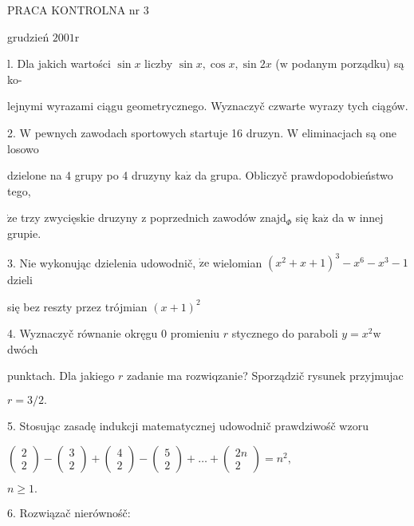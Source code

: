 \documentclass[a4paper,12pt]{article}
\begin{document}
PRACA KONTROLNA nr 3

grudzień $2001\mathrm{r}$

l. Dla jakich wartości $\sin x$ liczby $\sin x, \cos x, \sin 2x$ ($\mathrm{w}$ podanym porządku) są ko-

lejnymi wyrazami ciągu geometrycznego. Wyznaczyč czwarte wyrazy tych ciągów.

2. $\mathrm{W}$ pewnych zawodach sportowych startuje 16 druzyn. $\mathrm{W}$ eliminacjach są one losowo

dzielone na 4 grupy po 4 druzyny $\mathrm{k}\mathrm{a}\dot{\mathrm{z}}$ da grupa. Obliczyč prawdopodobieństwo tego,

$\dot{\mathrm{z}}\mathrm{e}$ trzy zwycięskie druzyny $\mathrm{z}$ poprzednich zawodów $\mathrm{z}\mathrm{n}\mathrm{a}\mathrm{j}\mathrm{d}_{\Phi}$ się $\mathrm{k}\mathrm{a}\dot{\mathrm{z}}$ da $\mathrm{w}$ innej grupie.

3. Nie wykonując dzielenia udowodnič, $\dot{\mathrm{z}}\mathrm{e}$ wielomian $(x^{2}+x+1)^{3}-x^{6}-x^{3}-1$ dzieli

się bez reszty przez trójmian $(x+1)^{2}$

4. Wyznaczyč równanie okręgu $0$ promieniu $r$ stycznego do paraboli $y=x^{2}\mathrm{w}$ dwóch

punktach. Dla jakiego $r$ zadanie ma rozwiqzanie? Sporządzič rysunek przyjmujac

$r=3/2.$

5. Stosując zasadę indukcji matematycznej udowodnič prawdziwośč wzoru

$\left(\begin{array}{l}
2\\
2
\end{array}\right) - \left(\begin{array}{l}
3\\
2
\end{array}\right) + \left(\begin{array}{l}
4\\
2
\end{array}\right) - \left(\begin{array}{l}
5\\
2
\end{array}\right) +\ldots+\left(\begin{array}{l}
2n\\
2
\end{array}\right) =n^{2},$

$n\geq 1.$

6. Rozwiązač nierównośč:
\end{document}
